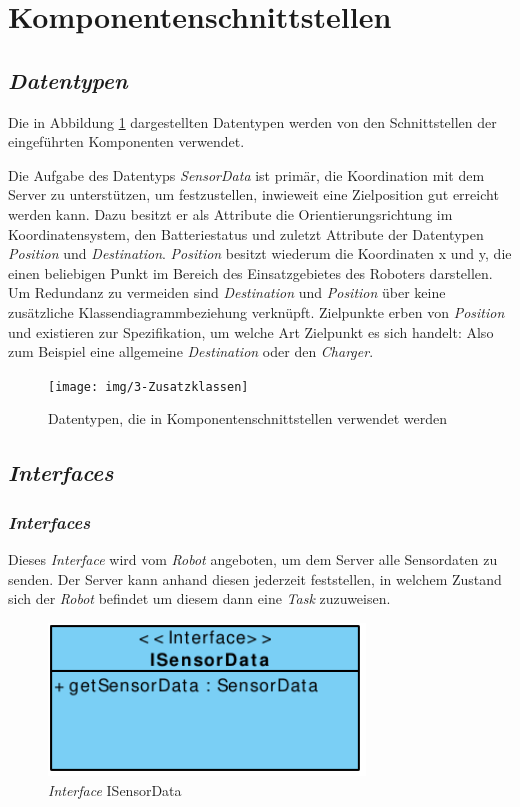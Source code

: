 \section{Komponentenschnittstellen}

\subsection{\textit{Datentypen}}
Die in Abbildung \ref{KomponentenschnittstellenDiagramm} dargestellten Datentypen werden von den Schnittstellen der eingeführten Komponenten verwendet. 

Die Aufgabe des Datentyps \emph{SensorData} ist primär, die Koordination mit dem Server zu unterstützen, um festzustellen, inwieweit eine Zielposition gut erreicht werden kann. Dazu besitzt er als Attribute die Orientierungsrichtung im Koordinatensystem, den Batteriestatus und zuletzt Attribute der Datentypen \emph{Position} und \emph{Destination}. \emph{Position} besitzt wiederum die Koordinaten x und y, die einen beliebigen Punkt im Bereich des Einsatzgebietes des Roboters darstellen. Um Redundanz zu vermeiden sind \emph{Destination} und \emph{Position} über keine zusätzliche Klassendiagrammbeziehung verknüpft. Zielpunkte erben von \emph{Position} und existieren zur Spezifikation, um welche Art Zielpunkt es sich handelt: Also zum Beispiel eine allgemeine \emph{Destination} oder den \emph{Charger}.
	
	\begin{figure}[H]
		\centering
		\texttt{[image: img/3-Zusatzklassen]}
		\caption{Datentypen, die in Komponentenschnittstellen verwendet werden}
		\label{KomponentenschnittstellenDiagramm}
	\end{figure}

\subsection{\textit{Interfaces}}
	\subsubsection{\textit{Interfaces}}
	Dieses \textit{Interface} wird vom \textit{Robot} angeboten, um dem Server alle Sensordaten zu senden. Der Server kann anhand diesen jederzeit feststellen, in welchem Zustand sich der \textit{Robot} befindet um diesem dann eine \textit{Task} zuzuweisen.
	\begin{figure}[H]
	\centering
	\includegraphics[width=0.75\textwidth]{img/1-Entwurf-3-1_ISensorData}
	\caption{\textit{Interface} ISensorData}
	\label{ISensorData}
	\end{figure}
	
